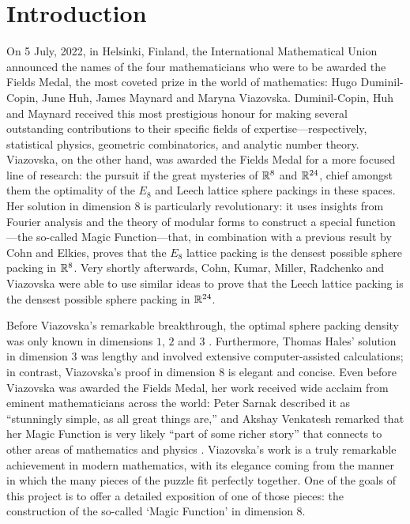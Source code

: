 \chapter{Introduction}
\thispagestyle{empty}

On 5 July, 2022, in Helsinki, Finland, the International Mathematical Union announced the names of the four mathematicians who were to be awarded the Fields Medal, the most coveted prize in the world of mathematics: Hugo Duminil-Copin, June Huh, James Maynard and Maryna Viazovska. Duminil-Copin, Huh and Maynard received this most prestigious honour for making several outstanding contributions to their specific fields of expertise---respectively, statistical physics, geometric combinatorics, and analytic number theory. Viazovska, on the other hand, was awarded the Fields Medal for a more focused line of research: the pursuit if the great mysteries of $\mathbb{R}^8$ and $\mathbb{R}^{24}$, chief amongst them the optimality of the $E_8$ and Leech lattice sphere packings in these spaces. Her solution in dimension $8$ is particularly revolutionary: it uses insights from Fourier analysis and the theory of modular forms to construct a special function---the so-called Magic Function---that, in combination with a previous result by Cohn and Elkies, proves that the $E_8$ lattice packing is the densest possible sphere packing in $\mathbb{R}^8$. Very shortly afterwards, Cohn, Kumar, Miller, Radchenko and Viazovska were able to use similar ideas to prove that the Leech lattice packing is the densest possible sphere packing in $\mathbb{R}^{24}$.

Before Viazovska's remarkable breakthrough, the optimal sphere packing density was only known in dimensions $1$, $2$ and $3$ \cite{CohnOnViazovskaICM}. Furthermore, Thomas Hales' solution in dimension $3$ \cite{HalesKeplerInformal} was lengthy and involved extensive computer-assisted calculations; in contrast, Viazovska's proof in dimension $8$ is elegant and concise. Even before Viazovska was awarded the Fields Medal, her work received wide acclaim from eminent mathematicians across the world: Peter Sarnak described it as ``stunningly simple, as all great things are,'' and Akshay Venkatesh remarked that her Magic Function is very likely ``part of some richer story'' that connects to other areas of mathematics and physics \cite{QuantaPiece}. Viazovska's work is a truly remarkable achievement in modern mathematics, with its elegance coming from the manner in which the many pieces of the puzzle fit perfectly together. One of the goals of this project is to offer a detailed exposition of one of those pieces: the construction of the so-called `Magic Function' in dimension $8$.



